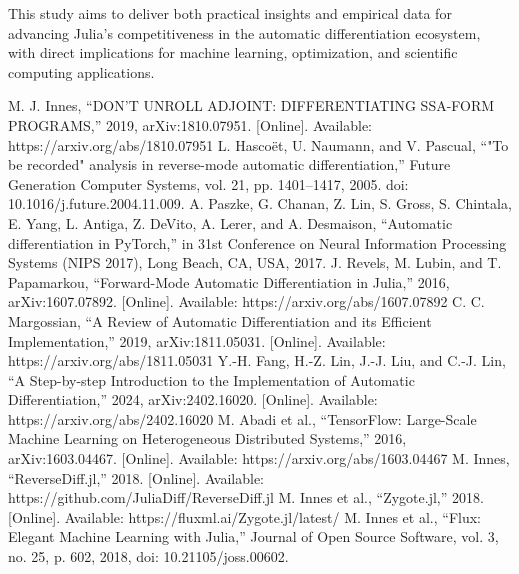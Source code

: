 \documentclass[conference]{IEEEtran}
\begin{document}
This study aims to deliver both practical insights and empirical data for advancing 
Julia's competitiveness in the automatic differentiation ecosystem, 
with direct implications for machine learning, optimization, 
and scientific computing applications.


\begin{thebibliography}{00}
 M. J. Innes, ``DON'T UNROLL ADJOINT: DIFFERENTIATING SSA-FORM PROGRAMS,'' 2019, arXiv:1810.07951. [Online]. Available: https://arxiv.org/abs/1810.07951
 L. Hascoët, U. Naumann, and V. Pascual, ``"To be recorded" analysis in reverse-mode automatic differentiation,'' Future Generation Computer Systems, vol. 21, pp. 1401--1417, 2005. doi: 10.1016/j.future.2004.11.009.
 A. Paszke, G. Chanan, Z. Lin, S. Gross, S. Chintala, E. Yang, L. Antiga, Z. DeVito, A. Lerer, and A. Desmaison, ``Automatic differentiation in PyTorch,'' in 31st Conference on Neural Information Processing Systems (NIPS 2017), Long Beach, CA, USA, 2017.
 J. Revels, M. Lubin, and T. Papamarkou, ``Forward-Mode Automatic Differentiation in Julia,'' 2016, arXiv:1607.07892. [Online]. Available: https://arxiv.org/abs/1607.07892
 C. C. Margossian, ``A Review of Automatic Differentiation and its Efficient Implementation,'' 2019, arXiv:1811.05031. [Online]. Available: https://arxiv.org/abs/1811.05031
 Y.-H. Fang, H.-Z. Lin, J.-J. Liu, and C.-J. Lin, ``A Step-by-step Introduction to the Implementation of Automatic Differentiation,'' 2024, arXiv:2402.16020. [Online]. Available: https://arxiv.org/abs/2402.16020
 M. Abadi et al., ``TensorFlow: Large-Scale Machine Learning on Heterogeneous Distributed Systems,'' 2016, arXiv:1603.04467. [Online]. Available: https://arxiv.org/abs/1603.04467
 M. Innes, ``ReverseDiff.jl,'' 2018. [Online]. Available: https://github.com/JuliaDiff/ReverseDiff.jl
 M. Innes et al., ``Zygote.jl,'' 2018. [Online]. Available: https://fluxml.ai/Zygote.jl/latest/
 M. Innes et al., ``Flux: Elegant Machine Learning with Julia,'' Journal of Open Source Software, vol. 3, no. 25, p. 602, 2018, doi: 10.21105/joss.00602.
\end{thebibliography}
\end{document}
